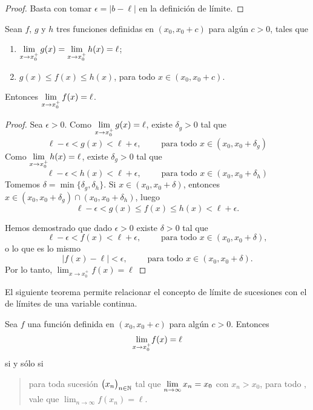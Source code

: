 \begin{proof}
Basta con tomar $\epsilon = |b-\ell|$ en la definición de límite.
\end{proof}

\begin{theorem}
    Sean $f$, $g$ y $h$ tres funciones definidas en $(x_0,x_0+c)$ para algún $c>0$, tales que
    \begin{enumerate}
        \item $\displaystyle\lim_{x\to x_0^+} g(x) = \lim_{x\to x_0^+} h(x) = \ell$;
        \item $g(x)\le f(x) \le h(x)$, para todo $x\in(x_0,x_0+c)$.
    \end{enumerate}
    Entonces $\displaystyle \lim_{x\to x_0^+} f(x)=\ell$.
\end{theorem}

\begin{proof}
Sea $\epsilon>0$.
Como $\displaystyle\lim_{x\to x_0^+} g(x)=\ell$, existe $\delta_g>0$ tal que
\[
\ell-\epsilon < g(x) < \ell+\epsilon, \qquad\text{ para todo $x\in(x_0,x_0+\delta_g)$}
\]
Como $\displaystyle\lim_{x\to x_0^+} h(x)=\ell$, existe $\delta_g>0$ tal que
\[
\ell-\epsilon < h(x) < \ell+\epsilon, \qquad\text{ para todo $x\in(x_0,x_0+\delta_h)$}
\]
Tomemos $\delta=\min\{\delta_g,\delta_h\}$.
Si $x\in(x_0,x_0+\delta)$, entonces $x\in(x_0,x_0+\delta_g)\cap(x_0,x_0+\delta_h)$, luego
\[
\ell-\epsilon < g(x)\le f(x) \le h(x)< \ell+\epsilon.
\]

Hemos demostrado que dado $\epsilon>0$ existe $\delta>0$ tal que 
\[
\ell-\epsilon < f(x)< \ell+\epsilon,
\qquad\text{ para todo $x\in(x_0,x_0+\delta)$},
\]
o lo que es lo mismo
\[
|f(x)-\ell| < \epsilon,
\qquad\text{ para todo $x\in(x_0,x_0+\delta)$}.
\]
Por lo tanto, $\lim_{x\to x_0^+}f(x)=\ell$
\end{proof}

El siguiente teorema permite relacionar el concepto de límite de sucesiones con el de límites de una variable continua.

\begin{theorem}\label{T:TFLD}
Sea $f$ una función definida en $(x_0,x_0+c)$ para algún $c>0$.
Entonces 
\[ \displaystyle {\ensuremath{\lim_{x\to x_0^+}}} f(x)=\ell
\]
si y sólo si 
\begin{quote}
    para toda sucesión $\big(x_n\big)_{n\in\mathbb{N}}$ tal que $\displaystyle\lim_{n\to\infty} x_n = x_0$ con $x_n > x_0$, para todo \niN, vale que $\lim_{n\to\infty}f(x_n)=\ell$.
\end{quote}
\end{theorem}

